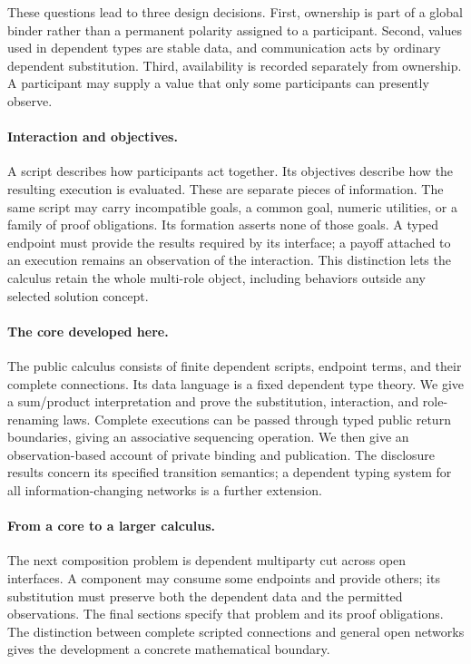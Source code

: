 These questions lead to three design decisions.
First, ownership is part of a global binder rather than a permanent polarity
assigned to a participant. Second, values used in dependent types are stable
data, and communication acts by ordinary dependent substitution. Third,
availability is recorded separately from ownership. A participant may supply a
value that only some participants can presently observe.

\paragraph{Interaction and objectives.}
A script describes how participants act together. Its objectives describe how
the resulting execution is evaluated. These are separate pieces of
information. The same script may carry incompatible goals, a common goal,
numeric utilities, or a family of proof obligations. Its formation asserts
none of those goals. A typed endpoint must provide the results required by its
interface; a payoff attached to an execution remains an observation of the
interaction. This distinction lets the calculus retain the whole multi-role
object, including behaviors outside any selected solution concept.

\paragraph{The core developed here.}
The public calculus consists of finite dependent scripts, endpoint terms, and
their complete connections. Its data language is a fixed dependent type theory.
We give a sum/product interpretation and prove the substitution, interaction,
and role-renaming laws. Complete executions can be passed through typed public
return boundaries, giving an associative sequencing operation. We then give an
observation-based account of private binding and publication. The disclosure
results concern its specified transition semantics; a dependent typing system
for all information-changing networks is a further extension.

\paragraph{From a core to a larger calculus.}
The next composition problem is dependent multiparty cut across open
interfaces. A component may consume some endpoints and provide others; its
substitution must preserve both the dependent data and the permitted
observations. The final sections specify that problem and its proof
obligations. The distinction between complete scripted connections and general
open networks gives the development a concrete mathematical boundary.
